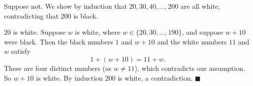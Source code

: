Suppose not. We show by induction that $20,30,40,\dots,200$ are all white, contradicting that $200$ is black.

$20$ is white. Suppose $w$ is white, where $w\in\{20,30,\dots,190\}$, and suppose $w+10$ were black. Then the black numbers $1$ and $w+10$ and the white numbers $11$ and $w$ satisfy
\[1+(w+10)=11+w.\]
These are four distinct numbers (as $w\ne11$), which contradicts our assumption. So $w+10$ is white. By induction $200$ is white, a contradiction. $\blacksquare$
